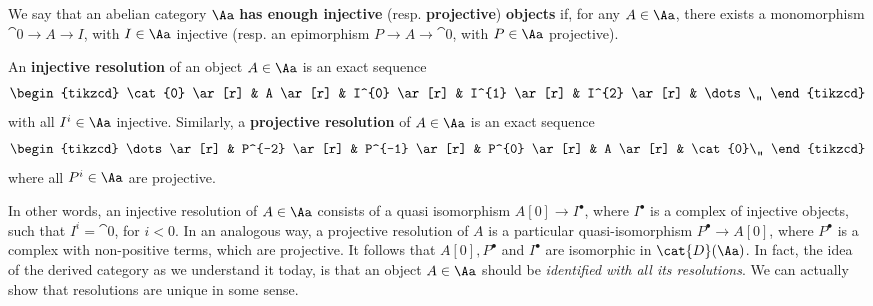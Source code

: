 \begin{df}
    We say that an abelian category $\Aa$ 
    \textbf{has enough injective} (resp. \textbf{projective})
    \textbf{objects} if, for any $A \in \Aa$,
    there exists a monomorphism $\cat{0} \to A \to I$,
    with $I \in \Aa$ injective 
    (resp. an epimorphism $P \to A \to \cat{0}$,
    with $P \in \Aa$ projective).

    An \textbf{injective resolution} of an object $A \in \Aa$
    is an exact sequence
    \begin{equation*}
        \begin{tikzcd}
            \cat{0} \ar[r]
            & A \ar[r]
            & I^{0} \ar[r]
            & I^{1} \ar[r]
            & I^{2} \ar[r]
            & \dots \,,
        \end{tikzcd}
    \end{equation*}
    with all $I^{i} \in \Aa$ injective. Similarly,
    a \textbf{projective resolution} of $A \in \Aa$
    is an exact sequence
    \begin{equation*}
        \begin{tikzcd}
            \dots \ar[r]
            & P^{-2} \ar[r]
            & P^{-1} \ar[r]
            & P^{0} \ar[r]
            & A \ar[r]
            & \cat{0}\,,
        \end{tikzcd}
    \end{equation*}
    where all $P^{i} \in \Aa$ are projective.
\end{df}

In other words, an injective resolution of $A \in \Aa$
consists of a quasi isomorphism
$A{[0]} \to I^{\bullet}$,
where $I^{\bullet}$ is a complex of injective objects,
such that $I^{i}=\cat{0}$, for $i < 0$.
In an analogous way, a projective resolution
of $A$ is a particular 
quasi-isomorphism $P^{\bullet} \to A{[0]}$,
where $P^{\bullet}$ is a complex with non-positive terms,
which are projective. It follows that
$A{[0]}, P^{\bullet}$ and $I^{\bullet}$
are isomorphic in $\cat{D}(\Aa)$. In fact,
the idea of the derived category as we understand it today,
is that an object $A \in \Aa$ should be
\emph{identified with all its resolutions}.
We can actually show that resolutions are unique in some sense.

